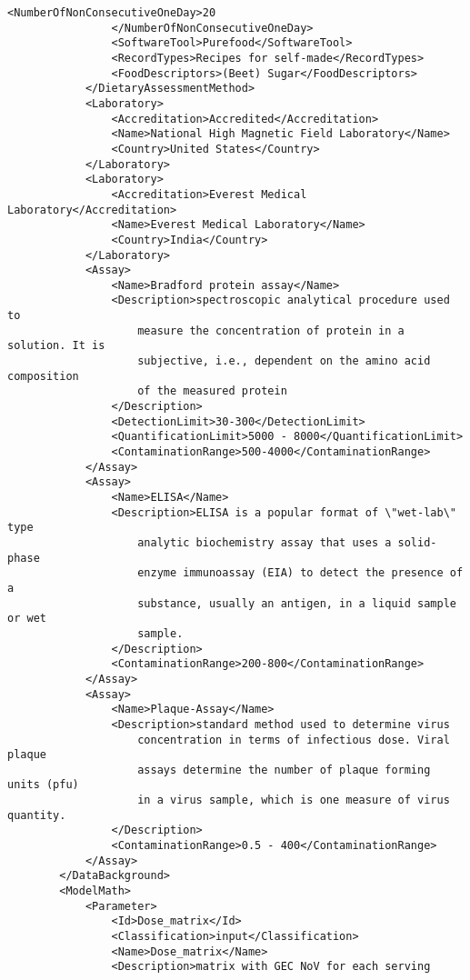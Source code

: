 \documentclass[a4paper]{report}
\begin{document}
\begin{lstlisting}[language=RAKIP, caption={Example of StudySample}]
                <NumberOfNonConsecutiveOneDay>20
                </NumberOfNonConsecutiveOneDay>
                <SoftwareTool>Purefood</SoftwareTool>
                <RecordTypes>Recipes for self-made</RecordTypes>
                <FoodDescriptors>(Beet) Sugar</FoodDescriptors>
            </DietaryAssessmentMethod>
            <Laboratory>
                <Accreditation>Accredited</Accreditation>
                <Name>National High Magnetic Field Laboratory</Name>
                <Country>United States</Country>
            </Laboratory>
            <Laboratory>
                <Accreditation>Everest Medical Laboratory</Accreditation>
                <Name>Everest Medical Laboratory</Name>
                <Country>India</Country>
            </Laboratory>
            <Assay>
                <Name>Bradford protein assay</Name>
                <Description>spectroscopic analytical procedure used to
                    measure the concentration of protein in a solution. It is
                    subjective, i.e., dependent on the amino acid composition
                    of the measured protein
                </Description>
                <DetectionLimit>30-300</DetectionLimit>
                <QuantificationLimit>5000 - 8000</QuantificationLimit>
                <ContaminationRange>500-4000</ContaminationRange>
            </Assay>
            <Assay>
                <Name>ELISA</Name>
                <Description>ELISA is a popular format of \"wet-lab\" type
                    analytic biochemistry assay that uses a solid-phase
                    enzyme immunoassay (EIA) to detect the presence of a
                    substance, usually an antigen, in a liquid sample or wet
                    sample.
                </Description>
                <ContaminationRange>200-800</ContaminationRange>
            </Assay>
            <Assay>
                <Name>Plaque-Assay</Name>
                <Description>standard method used to determine virus
                    concentration in terms of infectious dose. Viral plaque
                    assays determine the number of plaque forming units (pfu)
                    in a virus sample, which is one measure of virus quantity.
                </Description>
                <ContaminationRange>0.5 - 400</ContaminationRange>
            </Assay>
        </DataBackground>
        <ModelMath>
            <Parameter>
                <Id>Dose_matrix</Id>
                <Classification>input</Classification>
                <Name>Dose_matrix</Name>
                <Description>matrix with GEC NoV for each serving

\end{lstlisting}
\end{document}
